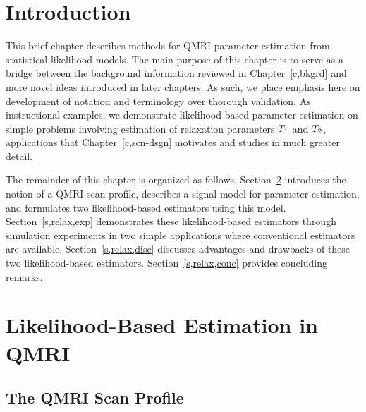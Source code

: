 
\section{Introduction}
\label{s,relax,intro}

This brief chapter describes methods
for QMRI parameter estimation
from statistical likelihood models.
The main purpose of this chapter
is to serve as a bridge 
between the background information
reviewed in Chapter~\ref{c,bkgrd}
and more novel ideas 
introduced in later chapters.
As such, 
we place emphasis here
on development of notation and terminology
over thorough validation.
As instructional examples,
we demonstrate likelihood-based parameter estimation
on simple problems
involving estimation 
of relaxation parameters $T_1$ and $T_2$,
applications
that Chapter~\ref{c,scn-dsgn} motivates and studies 
in much greater detail.

The remainder of this chapter 
is organized as follows.
Section~\ref{s,relax,meth}
introduces the notion of a QMRI scan profile,
describes a signal model for parameter estimation,
and formulates two likelihood-based estimators
using this model.
Section~\ref{s,relax,exp}
demonstrates these likelihood-based estimators
through simulation experiments
in two simple applications
where conventional estimators are available.
Section~\ref{s,relax,disc} 
discusses advantages and drawbacks 
of these two likelihood-based estimators.
Section~\ref{s,relax,conc} 
provides concluding remarks.

\section{Likelihood-Based Estimation in QMRI}
\label{s,relax,meth}

\subsection{The QMRI Scan Profile}
\label{ss,relax,meth,prof}

